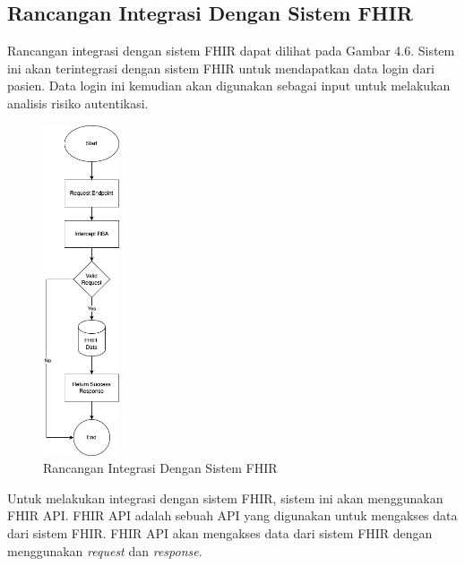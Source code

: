 \subsection{Rancangan Integrasi Dengan Sistem FHIR}
Rancangan integrasi dengan sistem FHIR dapat dilihat pada Gambar 4.6. Sistem ini akan terintegrasi dengan sistem FHIR untuk mendapatkan data login dari pasien. Data login ini kemudian akan digunakan sebagai input untuk melakukan analisis risiko autentikasi.
\begin{figure}[H]
    \centering
    \includegraphics[width=0.2\textwidth]{contents/chapter-4/fhir-rba.drawio.png}
    \caption{Rancangan Integrasi Dengan Sistem FHIR}
    \label{fig:integrasi}
\end{figure}

Untuk melakukan integrasi dengan sistem FHIR, sistem ini akan menggunakan FHIR API. FHIR API adalah sebuah API yang digunakan untuk mengakses data dari sistem FHIR. FHIR API akan mengakses data dari sistem FHIR dengan menggunakan \textit{request} dan \textit{response}.

